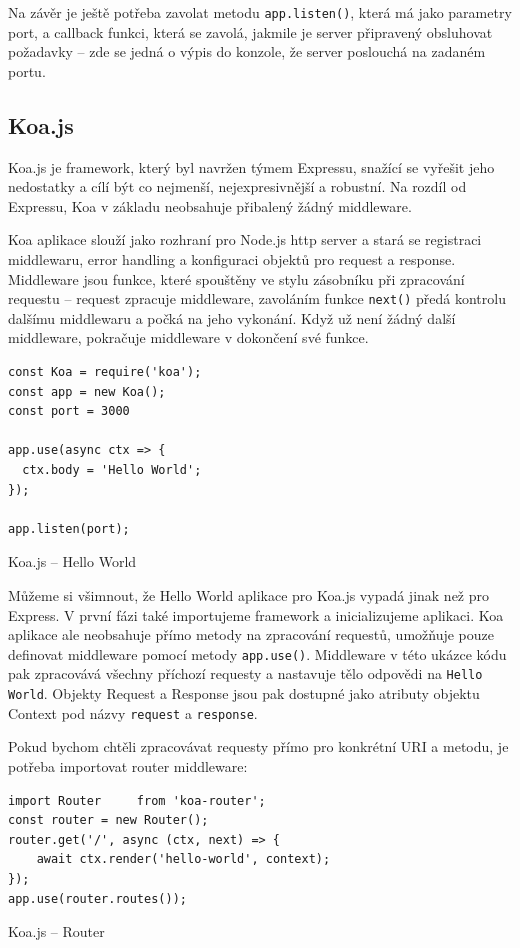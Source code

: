 \documentclass[thesis=M,czech]{FITthesis}[2019/12/23]
\begin{document}
Na závěr je ještě potřeba zavolat metodu \texttt{app.listen()}, která má jako parametry port, a callback funkci, která se zavolá, jakmile je server připravený obsluhovat požadavky -- zde se jedná o výpis do konzole, že server poslouchá na zadaném portu.

\subsection*{Koa.js}
Koa.js je framework, který byl navržen týmem Expressu, snažící se vyřešit jeho nedostatky a cílí být co nejmenší, nejexpresivnější a robustní. Na rozdíl od Expressu, Koa v základu neobsahuje přibalený žádný middleware.

Koa aplikace slouží jako rozhraní pro Node.js http server a stará se registraci middlewaru, error handling a konfiguraci objektů pro request a response.
Middleware jsou funkce, které spouštěny ve stylu zásobníku při zpracování requestu -- request zpracuje middleware, zavoláním funkce \texttt{next()} předá kontrolu dalšímu middlewaru a počká na jeho vykonání. Když už není žádný další middleware, pokračuje middleware v dokončení své funkce.

\begin{listing}[H]
\begin{verbatim}
const Koa = require('koa');
const app = new Koa();
const port = 3000

app.use(async ctx => {
  ctx.body = 'Hello World';
});

app.listen(port);
\end{verbatim}
\caption{Koa.js -- Hello World}
\label{lst:koa_hello}
\end{listing}

Můžeme si všimnout, že Hello World aplikace pro Koa.js vypadá jinak než pro Express. V první fázi také importujeme framework a inicializujeme aplikaci. Koa aplikace ale neobsahuje přímo metody na zpracování requestů, umožňuje pouze definovat middleware pomocí metody \texttt{app.use()}. Middleware v této ukázce kódu pak zpracovává všechny příchozí requesty a nastavuje tělo odpovědi na \texttt{Hello World}. Objekty Request a Response jsou pak dostupné jako atributy objektu Context pod názvy \texttt{request} a \texttt{response}.

Pokud bychom chtěli zpracovávat requesty přímo pro konkrétní URI a metodu, je potřeba importovat router middleware:

\begin{listing}[H]
\begin{verbatim}
import Router     from 'koa-router';
const router = new Router();
router.get('/', async (ctx, next) => {
    await ctx.render('hello-world', context);
});
app.use(router.routes());
\end{verbatim}
\caption{Koa.js -- Router}
\label{lst:koa_router}
\end{listing}
\end{document}
